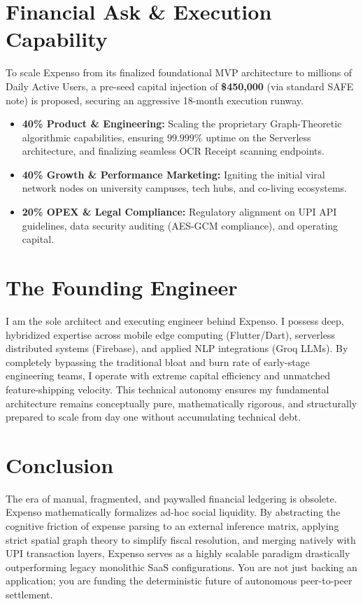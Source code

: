 \documentclass[11pt, letterpaper]{article}
\begin{document}
\section{Financial Ask \& Execution Capability}
To scale Expenso from its finalized foundational MVP architecture to millions of Daily Active Users, a pre-seed capital injection of \textbf{\$450,000} (via standard SAFE note) is proposed, securing an aggressive 18-month execution runway.

\begin{itemize}
    \item \textbf{40\% Product \& Engineering:} Scaling the proprietary Graph-Theoretic algorithmic capabilities, ensuring $99.999\%$ uptime on the Serverless architecture, and finalizing seamless OCR Receipt scanning endpoints.
    \item \textbf{40\% Growth \& Performance Marketing:} Igniting the initial viral network nodes on university campuses, tech hubs, and co-living ecosystems.
    \item \textbf{20\% OPEX \& Legal Compliance:} Regulatory alignment on UPI API guidelines, data security auditing (AES-GCM compliance), and operating capital.
\end{itemize}

\section{The Founding Engineer}
I am the sole architect and executing engineer behind Expenso. I possess deep, hybridized expertise across mobile edge computing (Flutter/Dart), serverless distributed systems (Firebase), and applied NLP integrations (Groq LLMs). By completely bypassing the traditional bloat and burn rate of early-stage engineering teams, I operate with extreme capital efficiency and unmatched feature-shipping velocity. This technical autonomy ensures my fundamental architecture remains conceptually pure, mathematically rigorous, and structurally prepared to scale from day one without accumulating technical debt.

\section{Conclusion}
The era of manual, fragmented, and paywalled financial ledgering is obsolete. Expenso mathematically formalizes ad-hoc social liquidity. By abstracting the cognitive friction of expense parsing to an external inference matrix, applying strict spatial graph theory to simplify fiscal resolution, and merging natively with UPI transaction layers, Expenso serves as a highly scalable paradigm drastically outperforming legacy monolithic SaaS configurations. You are not just backing an application; you are funding the deterministic future of autonomous peer-to-peer settlement.
\end{document}
